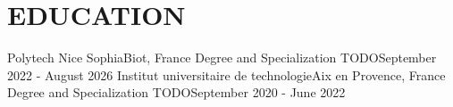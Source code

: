 \section{\color{airforceblue}EDUCATION}
  \resumeSubHeadingListStart
    \resumeSubheading
      {Polytech Nice Sophia}{Biot, France}
      {Degree and Specialization TODO}{September 2022 - August 2026}
    \resumeSubheading
      {Institut universitaire de technologie}{Aix en Provence, France}
      {Degree and Specialization TODO}{September 2020 - June 2022}
  \resumeSubHeadingListEnd
  \vspace{-10pt}
